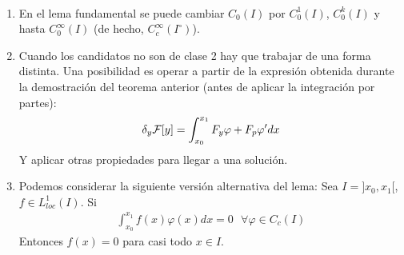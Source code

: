 \begin{observacion}\
    \begin{enumerate}
        \item En el lema fundamental se puede cambiar $C_0(I)$ por $C_0^1(I)$, $C_0^k(I)$ y hasta $C_0^\infty(I)$ (de hecho, $C_c^\infty(I^\circ)$).
        \item Cuando los candidatos no son de clase 2 hay que trabajar de una forma distinta. Una posibilidad es operar a partir de la expresión obtenida durante la demostración del teorema anterior (antes de aplicar la integración por partes):
        \begin{gather*}
            \delta_y \mathcal{F}[y] = \int_{x_0}^{x_1} F_y\varphi + F_p \varphi' dx
        \end{gather*}
        Y aplicar otras propiedades para llegar a una solución.
        \item Podemos considerar la siguiente versión alternativa del lema: Sea $I=]x_0, x_1[$, $f\in L_{loc}^1(I)$. Si
        \begin{gather*}
            \int_{x_0}^{x_1} f(x)\varphi(x) dx = 0 \ \ \ \forall \varphi \in C_c(I)
        \end{gather*}
        Entonces $f(x)=0$ para casi todo $x\in I$.
    \end{enumerate}
\end{observacion}

